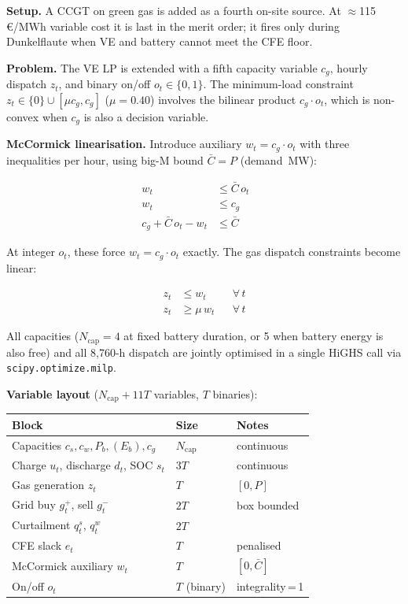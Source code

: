 \documentclass[10.5pt]{article}
\begin{document}
\textbf{Setup.} A CCGT on green gas is added as a fourth on-site source. At
$\approx$115\,€/MWh variable cost it is last in the merit order; it fires only during
Dunkelflaute when VE and battery cannot meet the CFE floor.

\textbf{Problem.} The VE LP is extended with a fifth capacity variable $c_g$, hourly
dispatch $z_t$, and binary on/off $o_t \in \{0,1\}$. The minimum-load constraint
$z_t \in \{0\} \cup [\mu c_g, c_g]$ ($\mu = 0.40$) involves the bilinear product
$c_g \cdot o_t$, which is non-convex when $c_g$ is also a decision variable.

\textbf{McCormick linearisation.} Introduce auxiliary $w_t = c_g \cdot o_t$ with
three inequalities per hour, using big-M bound $\bar{C} = P$ (demand~MW):

\begin{align}
  w_t &\leq \bar{C}\, o_t               && \label{eq:mc1}\\
  w_t &\leq c_g                          && \label{eq:mc2}\\
  c_g + \bar{C}\, o_t - w_t &\leq \bar{C} && \label{eq:mc3}
\end{align}

At integer $o_t$, these force $w_t = c_g \cdot o_t$ exactly. The gas dispatch
constraints become linear:

\begin{align}
  z_t &\leq w_t           && \forall\,t \label{eq:gas_up}\\
  z_t &\geq \mu\, w_t     && \forall\,t \label{eq:gas_lo}
\end{align}

All capacities ($N_\text{cap} = 4$ at fixed battery duration, or 5 when battery
energy is also free) and all 8,760-h dispatch are jointly optimised in a single
HiGHS call via \texttt{scipy.optimize.milp}.

\textbf{Variable layout} ($N_\text{cap} + 11T$ variables, $T$ binaries):

{\footnotesize
\begin{tabularx}{\linewidth}{l l >{\raggedright\arraybackslash}X}
\toprule
Block & Size & Notes \\
\midrule
Capacities $c_s, c_w, P_b, (E_b), c_g$ & $N_\text{cap}$ & continuous \\
Charge $u_t$, discharge $d_t$, SOC $s_t$ & $3T$ & continuous \\
Gas generation $z_t$ & $T$ & $[0, P]$ \\
Grid buy $g^+_t$, sell $g^-_t$ & $2T$ & box bounded \\
Curtailment $q^s_t$, $q^w_t$ & $2T$ & \\
CFE slack $e_t$ & $T$ & penalised \\
McCormick auxiliary $w_t$ & $T$ & $[0, \bar{C}]$ \\
On/off $o_t$ & $T$ (binary) & integrality\,=\,1 \\
\bottomrule
\end{tabularx}}
\end{document}
